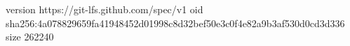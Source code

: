 version https://git-lfs.github.com/spec/v1
oid sha256:4a078829659fa41948452d01998c8d32bef50e3c0f4e82a9b3af530d0cd3d336
size 262240
